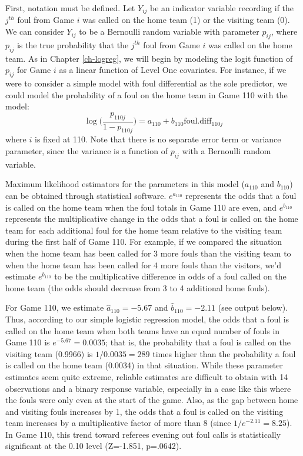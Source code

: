 \documentclass[
]{krantz}
\begin{document}
First, notation must be defined. Let \(Y_{ij}\) be an indicator variable recording if the \(j^{th}\) foul from Game \(i\) was called on the home team (1) or the visiting team (0). We can consider \(Y_{ij}\) to be a Bernoulli random variable with parameter \(p_{ij}\), where \(p_{ij}\) is the true probability that the \(j^{th}\) foul from Game \(i\) was called on the home team. As in Chapter \ref{ch-logreg}, we will begin by modeling the logit function of \(p_{ij}\) for Game \(i\) as a linear function of Level One covariates. For instance, if we were to consider a simple model with foul differential as the sole predictor, we could model the probability of a foul on the home team in Game 110 with the model:
\begin{equation}
\log\bigg(\frac{p_{110j}}{1-p_{110j}}\bigg)=a_{110}+b_{110}\mathrm{foul.diff}_{110j}
\label{eq:lev1glmm}
\end{equation}
where \(i\) is fixed at 110. Note that there is no separate error term or variance parameter, since the variance is a function of \(p_{ij}\) with a Bernoulli random variable.

Maximum likelihood estimators for the parameters in this model (\(a_{110}\) and \(b_{110}\)) can be obtained through statistical software. \(e^{a_{110}}\) represents the odds that a foul is called on the home team when the foul totals in Game 110 are even, and \(e^{b_{110}}\) represents the multiplicative change in the odds that a foul is called on the home team for each additional foul for the home team relative to the visiting team during the first half of Game 110. For example, if we compared the situation when the home team has been called for 3 more fouls than the visiting team to when the home team has been called for 4 more fouls than the visitors, we'd estimate \(e^{b_{110}}\) to be the multiplicative difference in odds of a foul called on the home team (the odds should decrease from 3 to 4 additional home fouls).

For Game 110, we estimate \(\hat{a}_{110}=-5.67\) and \(\hat{b}_{110}=-2.11\) (see output below). Thus, according to our simple logistic regression model, the odds that a foul is called on the home team when both teams have an equal number of fouls in Game 110 is \(e^{-5.67}=0.0035\); that is, the probability that a foul is called on the visiting team (0.9966) is \(1/0.0035 = 289\) times higher than the probability a foul is called on the home team (0.0034) in that situation. While these parameter estimates seem quite extreme, reliable estimates are difficult to obtain with 14 observations and a binary response variable, especially in a case like this where the fouls were only even at the start of the game. Also, as the gap between home and visiting fouls increases by 1, the odds that a foul is called on the visiting team increases by a multiplicative factor of more than 8 (since \(1/e^{-2.11}=8.25\)). In Game 110, this trend toward referees evening out foul calls is statistically significant at the 0.10 level (Z=-1.851, p=.0642).
\end{document}
